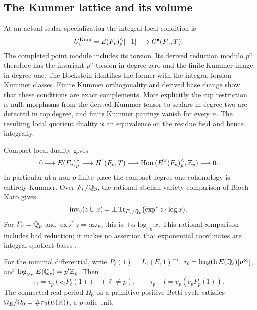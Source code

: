 \subsection{The Kummer lattice and its volume}

At an actual scalar specialization the integral local condition is
\[
 U_v^{\rm Kum}=E(F_v)^{\wedge}_p[-1]
 \longrightarrow C^\bullet(F_v,T).
\]
The completed point module includes its torsion.  Its derived
reduction modulo $p^n$ therefore has the invariant $p^n$-torsion in
degree zero and the finite Kummer image in degree one.  The
Bockstein identifies the former with the integral torsion Kummer
classes.  Finite Kummer orthogonality and derived base change show
that these conditions are exact complements.  More explicitly the
cup restriction is null: morphisms from the derived Kummer tensor
to scalars in degree two are detected in top degree, and finite
Kummer pairings vanish for every $n$.  The resulting local quotient
duality is an equivalence on the residue field and hence integrally.

Compact local duality gives
\[
 0\longrightarrow E(F_v)^{\wedge}_p\longrightarrow H^1(F_v,T)
 \longrightarrow
 \operatorname{Hom}(E^\vee(F_v)^{\wedge}_p,\mathbb Z_p)\longrightarrow0.
\]
In particular at a non-$p$ finite place the compact degree-one
cohomology is entirely Kummer.  Over $F_v/\mathbb Q_p$, the rational
abelian-variety comparison of Bloch--Kato gives
\begin{equation}\label{models:log-exp-pairing}
 \operatorname{inv}_v(z\cup x)
 =\pm\operatorname{Tr}_{F_v/\mathbb Q_p}\bigl(\exp^*z\cdot\log x\bigr).
\end{equation}
For $F_v=\mathbb Q_p$ and $\exp^*z=\alpha\omega_E$, this is
$\pm\alpha\log_{\omega_E}x$.  This rational comparison includes bad
reduction; it makes no assertion that exponential coordinates are
integral quotient bases \cite{BlochKato}.

\begin{lemma}\label{models:haar}
For the minimal differential, write $P_\ell(1)=L_\ell(E,1)^{-1}$,
$\tau_\ell=\operatorname{length} E(\mathbb Q_\ell)[p^\infty]$, and
$\log_{\omega_E}E(\mathbb Q_p)=p^l\mathbb Z_p$.  Then
\begin{equation}\label{models:haar-identities}
 \tau_\ell=v_p(c_\ell P_\ell(1))\quad(\ell\ne p),\qquad
 \tau_p-l=v_p(c_pP_p(1)).
\end{equation}
The connected real period $\Omega_0$ on a primitive positive Betti
cycle satisfies $\Omega_E/\Omega_0=\#\pi_0(E(\mathbb R))$, a $p$-adic unit.
\end{lemma}

